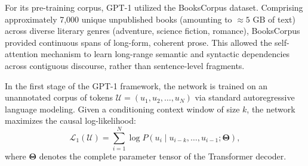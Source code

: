 \documentclass[../../main.tex]{subfiles}
\begin{document}
For its pre-training corpus, GPT-1 utilized the BooksCorpus dataset. Comprising approximately 7,000 unique unpublished books (amounting to $\approx 5\text{ GB}$ of text) across diverse literary genres (adventure, science fiction, romance), BooksCorpus provided continuous spans of long-form, coherent prose. This allowed the self-attention mechanism to learn long-range semantic and syntactic dependencies across contiguous discourse, rather than sentence-level fragments.

In the first stage of the GPT-1 framework, the network is trained on an unannotated corpus of tokens $\mathcal{U} = (u_1, u_2, \dots, u_N)$ via standard autoregressive language modeling. Given a conditioning context window of size $k$, the network maximizes the causal log-likelihood:
\begin{equation}
\mathcal{L}_1(\mathcal{U}) = \sum_{i=1}^N \log P(u_i \mid u_{i-k}, \dots, u_{i-1}; \boldsymbol{\Theta}),
\label{eq:gpt1_unsupervised_loss}
\end{equation}
where $\boldsymbol{\Theta}$ denotes the complete parameter tensor of the Transformer decoder.
\end{document}
